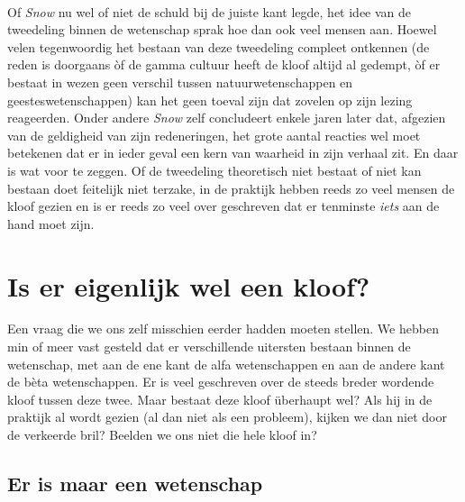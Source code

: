\paragraph{}

Of \emph{Snow} nu wel of niet de schuld bij de juiste kant legde, het idee van de tweedeling binnen de wetenschap sprak hoe dan ook veel mensen aan. Hoewel velen tegenwoordig het bestaan van deze tweedeling compleet ontkennen (de reden is doorgaans \`of de gamma cultuur heeft de kloof altijd al gedempt, \`of er bestaat in wezen geen verschil tussen natuurwetenschappen en geesteswetenschappen) kan het geen toeval zijn dat zovelen op zijn lezing reageerden. Onder andere \emph{Snow} zelf concludeert enkele jaren later dat, afgezien van de geldigheid van zijn redeneringen, het grote aantal reacties wel moet betekenen dat er in ieder geval een kern van waarheid in zijn verhaal zit.\cite{Berkel} En daar is wat voor te zeggen. Of de tweedeling theoretisch niet bestaat of niet kan bestaan doet feitelijk niet terzake, in de praktijk hebben reeds zo veel mensen de kloof gezien en is er reeds zo veel over geschreven dat er tenminste \emph{iets} aan de hand moet zijn.


\section{Is er eigenlijk wel een kloof?}


Een vraag die we ons zelf misschien eerder hadden moeten stellen. We hebben min of meer vast gesteld dat er verschillende uitersten bestaan binnen de wetenschap, met aan de ene kant de alfa wetenschappen en aan de andere kant de b\`eta wetenschappen. Er is veel geschreven over de steeds breder wordende kloof tussen deze twee. Maar bestaat deze kloof \"uberhaupt wel? Als hij in de praktijk al wordt gezien (al dan niet als een probleem), kijken we dan niet door de verkeerde bril? Beelden we ons niet die hele kloof in?


\subsection{Er is maar een wetenschap}\label{sec:eenwetenschap}

